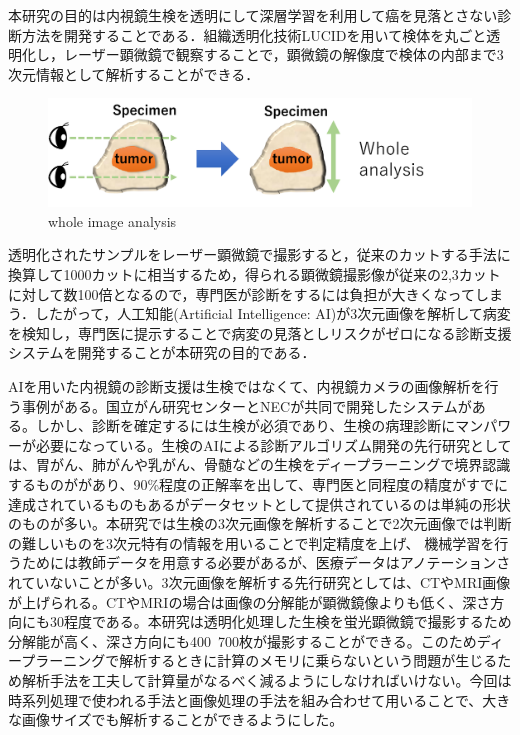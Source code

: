 本研究の目的は内視鏡生検を透明にして深層学習を利用して癌を見落とさない診断方法を開発することである．組織透明化技術LUCIDを用いて検体を丸ごと透明化し，レーザー顕微鏡で観察することで，顕微鏡の解像度で検体の内部まで3次元情報として解析することができる．

\begin{figure}[H]
	\centering
	\includegraphics[width=0.7\linewidth]{fig/chapter1/whole_image_analysis}
	\caption{whole image analysis}
	\label{fig:wholeimageanalysis}
\end{figure}


透明化されたサンプルをレーザー顕微鏡で撮影すると，従来のカットする手法に換算して1000カットに相当するため，得られる顕微鏡撮影像が従来の2,3カットに対して数100倍となるので，専門医が診断をするには負担が大きくなってしまう．したがって，人工知能(Artificial Intelligence: AI)が3次元画像を解析して病変を検知し，専門医に提示することで病変の見落としリスクがゼロになる診断支援システムを開発することが本研究の目的である．

AIを用いた内視鏡の診断支援は生検ではなくて、内視鏡カメラの画像解析を行う事例がある。国立がん研究センターとNECが共同で開発したシステムがある。しかし、診断を確定するには生検が必須であり、生検の病理診断にマンパワーが必要になっている。生検のAIによる診断アルゴリズム開発の先行研究としては、胃がん、肺がんや乳がん、骨髄などの生検をディープラーニングで境界認識するものががあり、90\%程度の正解率を出して、専門医と同程度の精度がすでに達成されているものもあるがデータセットとして提供されているのは単純の形状のものが多い。本研究では生検の3次元画像を解析することで2次元画像では判断の難しいものを3次元特有の情報を用いることで判定精度を上げ、
機械学習を行うためには教師データを用意する必要があるが、医療データはアノテーションされていないことが多い。3次元画像を解析する先行研究としては、CTやMRI画像が上げられる。CTやMRIの場合は画像の分解能が顕微鏡像よりも低く、深さ方向にも30程度である。本研究は透明化処理した生検を蛍光顕微鏡で撮影するため分解能が高く、深さ方向にも400~700枚が撮影することができる。このためディープラーニングで解析するときに計算のメモリに乗らないという問題が生じるため解析手法を工夫して計算量がなるべく減るようにしなければいけない。今回は時系列処理で使われる手法と画像処理の手法を組み合わせて用いることで、大きな画像サイズでも解析することができるようにした。


